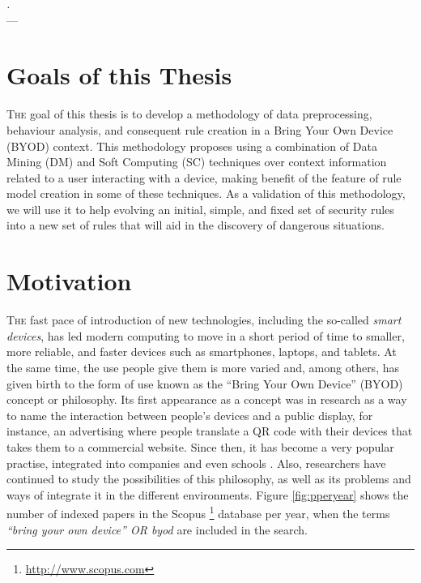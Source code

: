 \label{chap:introduction}
\begin{flushright}{\slshape
    .} \\ \medskip
    --- {}
\end{flushright}
\minitoc\mtcskip
\vfill



\section{Goals of this Thesis} 

\lettrine{T}{he} goal of this thesis is to develop a methodology of data preprocessing, behaviour analysis, and consequent rule creation in a Bring Your Own Device (BYOD) context. This methodology proposes using a combination of Data Mining (DM) and Soft Computing (SC) techniques %
 over context information related to a user interacting with a device, making benefit of the feature of rule model creation in some of these techniques. As a validation of this methodology, we will use it to help evolving an initial, simple, and fixed set of security rules into a new set of rules that will aid in the discovery of dangerous situations.

\section{Motivation}
\label{sec:intro:byod}

\lettrine{T}{he} fast pace of introduction of new technologies, including the so-called \textit{smart devices}, has led modern computing to move in a short period of time to smaller, more reliable, and faster devices such as smartphones, laptops, and tablets. At the same time, the use people give them is more varied and, among others, has given birth to the form of use known as the ``Bring Your Own Device'' (BYOD) concept or philosophy. Its first appearance as a concept was in research \cite{ballagas2004byod} as a way to name the interaction between people's devices and a public display, for instance, an advertising where people translate a QR code with their devices that takes them to a commercial website. Since then, it has become a very popular practise, integrated into companies \cite{thomson2012byod} and even schools \cite{song2014bring}. Also, researchers have continued to study the possibilities of this philosophy, as well as its problems and ways of integrate it in the different environments. Figure \ref{fig:pperyear} shows the number of indexed papers in the Scopus \footnote{\url{http://www.scopus.com}} database per year, when the terms {\em ``bring your own device'' OR byod} are included in the search.

